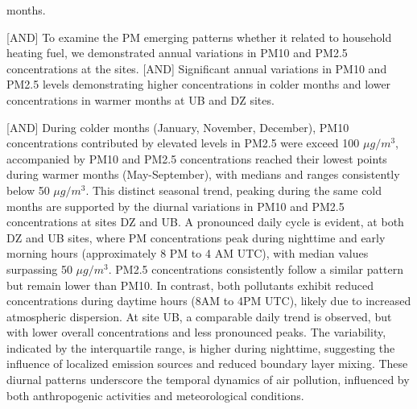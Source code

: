 \documentclass[
  11pt,
]{article}
\begin{document}
{months.}\label{to-evaluate-the-spatial-variations-in-particulate-matter-pm-concentrations-we-displayed-hourly-observed-values-of-pm10-and-pm2.5-for-all-study-sites-figure_3.-the-mean-p-values-indicate-that-pm-concentrations-differ-significantly-at-a-99-confidence-level-across-all-sites-figure_3-with-the-exception-of-a-95-confidence-level-between-dz-and-ub-for-pm10-figure_3a-highlighting-substantial-concentration-disparities-among-sites.-while-quantitative-differences-in-pm-concentration-values-exist-across-all-sites-two-key-patterns-emerge-when-examining-median-deviations-from-mean-values-and-irregular-observation-fluctuations.-for-instance-pm10-demonstrates-more-erratic-behavior-than-pm2.5-at-each-location-particularly-evident-at-zu-and-ss-sites.-furthermore-the-mean-values-calculated-from-hourly-measurements-surpass-the-median-concentrations-for-both-pm10-and-pm2.5-across-all-sites-with-notable-prominence-at-ub-and-dz-locations.-consequently-significant-spatial-differences-in-pm-concentrations-exist-among-all-sites-regardless-of-urban-or-rural-classification.-however-the-sites-can-be-categorized-into-two-groups-based-on-their-characteristics-ub-urban-and-dz-rural-town-gobi-and-ss-rural-gobi-and-zu-rural-gobi.-these-findings-for-dz-appear-to-support-our-hypothesis-of-emerging-new-emission-patterns-related-to-increased-coal-consumption-during-winter-months.}

{[}AND{]} To examine the PM emerging patterns whether it related to
household heating fuel, we demonstrated annual variations in PM10 and
PM2.5 concentrations at the sites. {[}AND{]} Significant annual
variations in PM10 and PM2.5 levels demonstrating higher concentrations
in colder months and lower concentrations in warmer months at UB and DZ
sites.

{[}AND{]} During colder months (January, November, December), PM10
concentrations contributed by elevated levels in PM2.5 were exceed 100
\(\mu g/m^3\), accompanied by PM10 and PM2.5 concentrations reached
their lowest points during warmer months (May-September), with medians
and ranges consistently below 50 \(\mu g/m^3\). This distinct seasonal
trend, peaking during the same cold months are supported by the diurnal
variations in PM10 and PM2.5 concentrations at sites DZ and UB. A
pronounced daily cycle is evident, at both DZ and UB sites, where PM
concentrations peak during nighttime and early morning hours
(approximately 8 PM to 4 AM UTC), with median values surpassing 50
\(\mu g/m^3\). PM2.5 concentrations consistently follow a similar
pattern but remain lower than PM10. In contrast, both pollutants exhibit
reduced concentrations during daytime hours (8AM to 4PM UTC), likely due
to increased atmospheric dispersion. At site UB, a comparable daily
trend is observed, but with lower overall concentrations and less
pronounced peaks. The variability, indicated by the interquartile range,
is higher during nighttime, suggesting the influence of localized
emission sources and reduced boundary layer mixing. These diurnal
patterns underscore the temporal dynamics of air pollution, influenced
by both anthropogenic activities and meteorological conditions.
\end{document}
